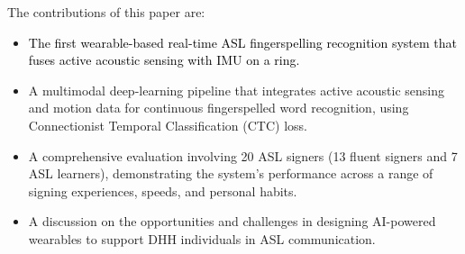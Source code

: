 The contributions of this paper are:
\begin{itemize}
  \item \textcolor{black}{The first wearable-based real-time ASL fingerspelling recognition system that fuses active acoustic sensing with IMU on a ring.}

  \item A multimodal deep-learning pipeline that integrates active acoustic sensing and motion data for continuous fingerspelled word recognition, using Connectionist Temporal Classification (CTC) loss.

  \item A comprehensive evaluation involving 20 ASL signers (13 fluent signers and 7 ASL learners), demonstrating the system's performance across a range of signing experiences, speeds, and personal habits.

  \item A discussion on the opportunities and challenges in designing AI-powered wearables to support DHH individuals in ASL communication.
\end{itemize}










